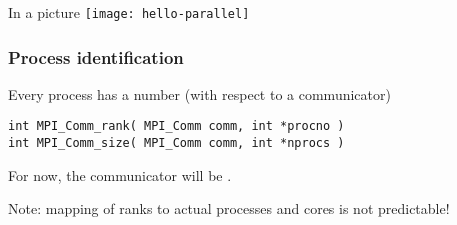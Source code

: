 \begin{frame}{In a picture}
  \texttt{[image: hello-parallel]}
\end{frame}

\begin{frame}[containsverbatim]\frametitle{Process identification}
Every process has a number (with respect to a communicator)
\begin{verbatim}
int MPI_Comm_rank( MPI_Comm comm, int *procno )
int MPI_Comm_size( MPI_Comm comm, int *nprocs )
\end{verbatim}
For now, the communicator will be .

Note: mapping of ranks to actual processes and cores is not predictable!
\end{frame}

